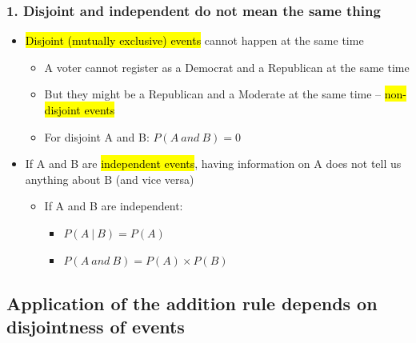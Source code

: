 \documentclass[slidestop,compress,mathserif,11pt,t,professionalfonts,xcolor=table]{beamer}
\begin{document}
\begin{frame}
\frametitle{1. Disjoint and independent do not mean the same thing}

\begin{itemize}

\item \hl{Disjoint (mutually exclusive) events} cannot happen at the same time
\begin{itemize}
\item A voter cannot register as a Democrat and a Republican at the same time
\item But they might be a Republican and a Moderate at the same time -- 
\hl{non-disjoint events}
\item For disjoint A and B: $P(A~and~B) = 0$
\end{itemize}

\pause

\item If A and B are \hl{independent events}, having information on A does 
not tell us anything about B (and vice versa)
\begin{itemize}
\item If A and B are independent: 
\begin{itemize}
\item $P(A~|~B) = P(A)$
\item $P(A~and~B) = P(A) \times P(B)$
\end{itemize}
\end{itemize}

\end{itemize}
\end{frame}


\subsection{Application of the addition rule depends on disjointness of events}
\label{mi2}

\end{document}
